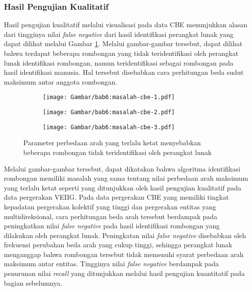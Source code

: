 \subsubsection{Hasil Pengujian Kualitatif}
\label{subsub:sec:cbe-qualitative}

Hasil pengujian kualitatif melalui visualisasi pada data CBE menunjukkan alasan dari tingginya nilai \textit{false negative} dari hasil identifikasi perangkat lunak yang dapat dilihat melalui Gambar \ref{bab6:masalah-cbe}. Melalui gambar-gambar tersebut, dapat dilihat bahwa terdapat beberapa rombongan yang tidak teridentifikasi oleh perangkat lunak identifikasi rombongan, namun teridentifikasi sebagai rombongan pada hasil identifikasi manusia. Hal tersebut disebabkan cara perhitungan beda sudut maksimum antar anggota rombongan.

\begin{figure}[h]
    \centering
    \captionsetup{width=.75\textwidth}
    \begin{subfigure}[h]{0.225\textwidth}
        \centering
        \texttt{[image: Gambar/bab6:masalah-cbe-1.pdf]}
    \end{subfigure}
    \begin{subfigure}[h]{0.225\textwidth}
        \centering
        \texttt{[image: Gambar/bab6:masalah-cbe-2.pdf]}
    \end{subfigure}
    \begin{subfigure}[h]{0.225\textwidth}
        \centering
        \texttt{[image: Gambar/bab6:masalah-cbe-3.pdf]}
    \end{subfigure}
    \caption[Masalah syarat perbedaan arah maksimum pada data CBE]{Parameter perbedaan arah yang terlalu ketat menyebabkan beberapa rombongan tidak teridentifikasi oleh perangkat lunak}
    \label{bab6:masalah-cbe}
\end{figure}

Melalui gambar-gambar tersebut, dapat dikatakan bahwa algoritma identifikasi rombongan memiliki masalah yang sama tentang nilai perbedaan arah maksimum yang terlalu ketat seperti yang ditunjukkan oleh hasil pengujian kualitatif pada data pergerakan VEIIG. Pada data pergerakan CBE yang memiliki tingkat kepadatan pergerakan kolektif yang tinggi dan pergerakan entitas yang multidireksional, cara perhitungan beda arah tersebut berdampak pada peningkatkan nilai \textit{false negative} pada hasil identifikasi rombongan yang dilakukan oleh perangkat lunak. Peningkatan nilai \textit{false negative} disebabkan oleh frekuensi perubahan beda arah yang cukup tinggi, sehingga perangkat lunak menganggap bahwa rombongan tersebut tidak memenuhi syarat perbedaan arah maksimum antar entitas. Tingginya nilai \textit{false negative} berdampak pada penurunan nilai \textit{recall} yang ditunjukkan melalui hasil pengujian kuantitatif pada bagian sebelumnya.

